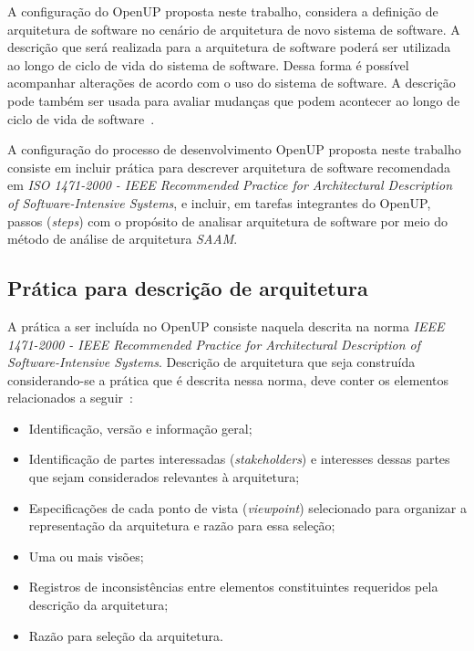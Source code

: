 A configuração do OpenUP proposta neste trabalho, considera a definição de arquitetura de software no cenário de arquitetura de novo sistema de software. A descrição que será realizada para a arquitetura de software poderá ser utilizada ao longo de ciclo de vida do sistema de software. Dessa forma é possível acompanhar alterações de acordo com o uso do sistema de software. A descrição pode também ser usada para avaliar mudanças que podem acontecer ao longo de ciclo de vida de software~\cite{ISO_1471}.

A configuração do processo de desenvolvimento OpenUP proposta neste trabalho consiste em incluir prática para descrever arquitetura de software recomendada em \emph{ISO 1471-2000 - IEEE Recommended Practice for Architectural Description of Software-Intensive Systems}, e incluir, em tarefas integrantes do OpenUP, passos (\emph{steps}) com o propósito de analisar arquitetura de software por meio do método de análise de arquitetura \emph{\acrfull{SAAM}}.

\subsection{Prática para descrição de arquitetura}

A prática a ser incluída no OpenUP consiste naquela descrita na norma \emph{IEEE 1471-2000 - IEEE Recommended Practice for Architectural Description of Software-Intensive Systems}. Descrição de arquitetura que seja construída considerando-se a prática que é descrita nessa norma, deve conter os elementos  relacionados a seguir~\cite{ISO_1471}:

\begin{itemize}
    \item Identificação, versão e informação geral;
    \item Identificação de partes interessadas (\emph{stakeholders}) e interesses dessas partes que sejam considerados relevantes à arquitetura;
    \item Especificações de cada ponto de vista (\emph{viewpoint}) selecionado para organizar a representação da arquitetura e razão para essa seleção;
    \item Uma ou mais visões;
    \item Registros de inconsistências entre elementos constituintes requeridos pela descrição da arquitetura;
    \item Razão para seleção da arquitetura.

\end{itemize}

